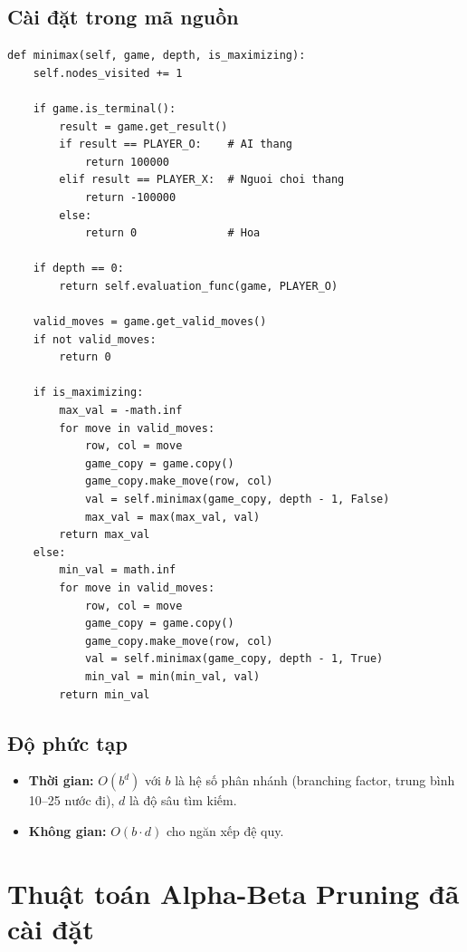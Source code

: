 \documentclass[12pt,a4paper]{article}
\begin{document}
\subsection{Cài đặt trong mã nguồn}

\begin{lstlisting}[caption={Cài đặt thuật toán Minimax (\texttt{ai\_agent.py})}]
def minimax(self, game, depth, is_maximizing):
    self.nodes_visited += 1

    if game.is_terminal():
        result = game.get_result()
        if result == PLAYER_O:    # AI thang
            return 100000
        elif result == PLAYER_X:  # Nguoi choi thang
            return -100000
        else:
            return 0              # Hoa

    if depth == 0:
        return self.evaluation_func(game, PLAYER_O)

    valid_moves = game.get_valid_moves()
    if not valid_moves:
        return 0

    if is_maximizing:
        max_val = -math.inf
        for move in valid_moves:
            row, col = move
            game_copy = game.copy()
            game_copy.make_move(row, col)
            val = self.minimax(game_copy, depth - 1, False)
            max_val = max(max_val, val)
        return max_val
    else:
        min_val = math.inf
        for move in valid_moves:
            row, col = move
            game_copy = game.copy()
            game_copy.make_move(row, col)
            val = self.minimax(game_copy, depth - 1, True)
            min_val = min(min_val, val)
        return min_val
\end{lstlisting}

\subsection{Độ phức tạp}

\begin{itemize}
    \item \textbf{Thời gian:} $O(b^d)$ với $b$ là hệ số phân nhánh (branching factor, trung bình 10--25 nước đi), $d$ là độ sâu tìm kiếm.
    \item \textbf{Không gian:} $O(b \cdot d)$ cho ngăn xếp đệ quy.
\end{itemize}

\section{Thuật toán Alpha-Beta Pruning đã cài đặt}
\end{document}
